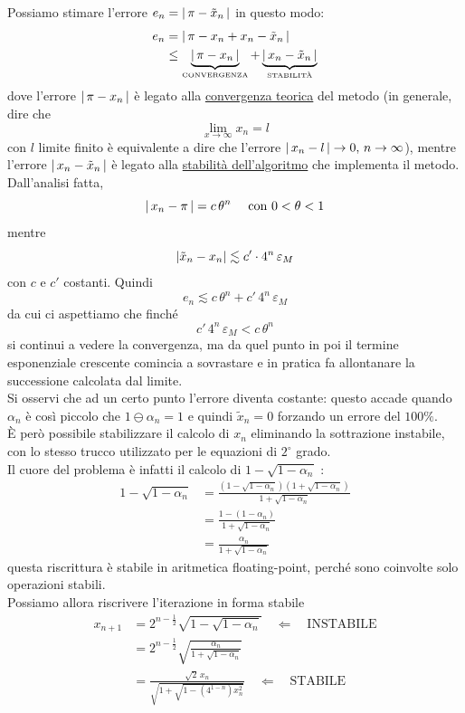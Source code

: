 Possiamo stimare l'errore $ e_n=\lvert\,\pi - \Tilde{x}_n\,\rvert $ in questo modo:
\[\begin{split}
    e_n & = \lvert\,\pi - x_n + x_n - \Tilde{x}_n\,\rvert \\
    & \le \underbrace{\lvert\,\pi - x_{n}\,\rvert}_{\text{\tiny{CONVERGENZA}}} + \underbrace{\lvert\,x_n - \Tilde{x}_n\,\rvert}_{\text{\tiny{STABILITÀ}}}
\end{split}\]
dove l'errore $\lvert\,\pi - x_{n}\,\rvert$ è legato alla \uline{convergenza teorica} del metodo (in generale, dire che
\[\lim_{x\to \infty} x_{n} = l\]
con $l$ limite finito è equivalente a dire che l'errore $\lvert\,x_n - l\,\rvert\to 0,\, n \to \infty $), mentre l'errore $\lvert\,x_n - \Tilde{x}_n\,\rvert$ è legato alla \uline{stabilità dell'algoritmo} che implementa il metodo. \\
Dall'analisi fatta, 
\[\lvert\,x_n - \pi\,\rvert = c\,\theta^{n} \quad \text{ con } 0<\theta<1\] mentre 
\[\lvert\Tilde{x}_n - x_n\rvert \lesssim c' \cdot 4^n\,\varepsilon_{M}\] 
con $c$ e $c'$ costanti. Quindi 
\[ e_n \lesssim c\,\theta^n + c' \, 4^n\,\varepsilon_{M} \]
da cui ci aspettiamo che finché 
\[c'\,4^{n}\,\varepsilon_{M}<c\,\theta^{n}\] 
si continui a vedere la convergenza, ma da quel punto in poi il termine esponenziale crescente comincia a sovrastare e in pratica fa allontanare la successione calcolata dal limite. \\
Si osservi che ad un certo punto l'errore diventa costante: questo accade quando $\alpha_n$ è così piccolo che $1 \ominus \alpha_n = 1$ e quindi $\tilde{x}_n=0$ forzando un errore del $100\%$.\\
È però possibile stabilizzare il calcolo di $x_n$ eliminando la sottrazione instabile, con lo stesso trucco utilizzato per le equazioni di $2^\circ$ grado. \\
Il cuore del problema è infatti il calcolo di  $1-\sqrt{1-\alpha_{n}}$ :
\[\begin{split}
    1-\sqrt{1-\alpha_{n}} & = \frac{(1-\sqrt{1-\alpha_n})(1+\sqrt{1-\alpha_n})}{1+\sqrt{1-\alpha_n}} \\
    & = \frac{1-(1-\alpha_n)}{1+\sqrt{1-\alpha_n}} \\ 
    & = \frac{\alpha_n}{1+\sqrt{1-\alpha_n}}
\end{split}\]
questa riscrittura è stabile in aritmetica floating-point, perché sono coinvolte solo operazioni stabili.\\
Possiamo allora riscrivere l'iterazione in forma stabile 
\[\begin{split}
    x_{n+1} & = 2^{n-\frac{1}{2}}\sqrt{1-\sqrt{1-\alpha_n}} \quad \Longleftarrow \quad \text{INSTABILE} \\
    & = 2^{n-\frac{1}{2}}\sqrt{\frac{\alpha_n}{1+\sqrt{1-\alpha_n}}} \\
    & = \frac{\sqrt{2}\,x_n}{\sqrt{1+\sqrt{1-(4^{1-n})x_{n}^{2}}}} \quad \Longleftarrow \quad \text{STABILE}
\end{split}\]
